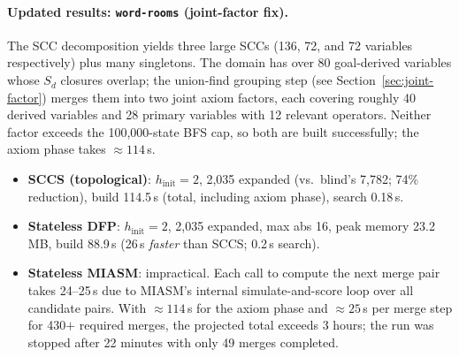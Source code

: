 \documentclass[11pt,a4paper]{article}
\begin{document}
    \paragraph{Updated results: \texttt{word-rooms} (joint-factor fix).}
    \label{par:word-rooms}

    The SCC decomposition yields three large SCCs (136, 72, and 72
    variables respectively) plus many singletons.  The domain has over
    80 goal-derived variables whose $S_d$ closures overlap; the union-find
    grouping step (see Section~\ref{sec:joint-factor}) merges them into
    two joint axiom factors, each covering roughly 40 derived variables
    and 28 primary variables with 12 relevant operators.  Neither factor
    exceeds the 100{,}000-state BFS cap, so both are built successfully;
    the axiom phase takes $\approx 114$\,s.

    \begin{itemize}
      \item \textbf{SCCS (topological)}: $h_{\mathrm{init}} = 2$,
            2{,}035 expanded (vs.\ blind's 7{,}782; 74\% reduction),
            build 114.5\,s (total, including axiom phase), search 0.18\,s.
      \item \textbf{Stateless DFP}: $h_{\mathrm{init}} = 2$,
            2{,}035 expanded, max abs 16, peak memory 23.2\,MB,
            build 88.9\,s (26\,s \emph{faster} than SCCS; 0.2\,s search).
      \item \textbf{Stateless MIASM}: impractical.  Each call to
            compute the next merge pair takes 24--25\,s due to MIASM's
            internal simulate-and-score loop over all candidate pairs.
            With $\approx 114$\,s for the axiom phase and $\approx 25$\,s
            per merge step for 430$+$ required merges, the projected total
            exceeds 3 hours; the run was stopped after 22 minutes with
            only 49 merges completed.
    \end{itemize}
\end{document}
